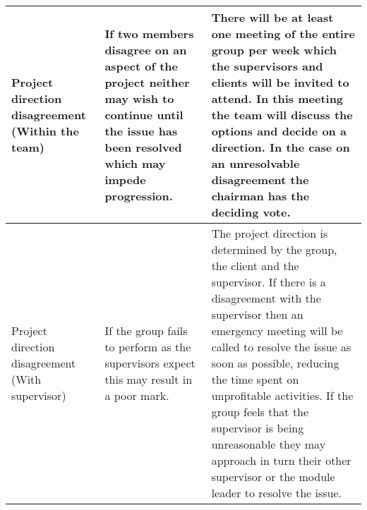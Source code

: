 \begin{center}
\begin{landscape}
\begin{longtable}{|p{3cm}|p{7cm}|p{12cm}|}
        Project direction disagreement (Within the team) & If two members disagree on an aspect of the project neither may wish to continue until the issue has been resolved which may impede progression.                                                                                                                                                                                                                             & There will be at least one meeting of the entire group per week which the supervisors and clients will be invited to attend. In this meeting the team will discuss the options and decide on a direction. In the case on an unresolvable disagreement the chairman has the deciding vote.                                                                                                                                                                                                                                                                                                                                                                                                                                                                                                                                                                                                                                                                                                                                                \\ \hline
        Project direction disagreement (With supervisor) & If the group fails to perform as the supervisors expect this may result in a poor mark.                                                                                                                                                                                                                                                                                      & The project direction is determined by the group, the client and the supervisor. If there is a disagreement with the supervisor then an emergency meeting will be called to resolve the issue as soon as possible, reducing the time spent on unprofitable activities. If the group feels that the supervisor is being unreasonable they may approach in turn their other supervisor or the module leader to resolve the issue.                                                                                                                                                                                                                                                                                                                                                                                                                                                                                                                                                                                                          \\ \hline

\end{longtable}
\end{landscape}
\end{center}
